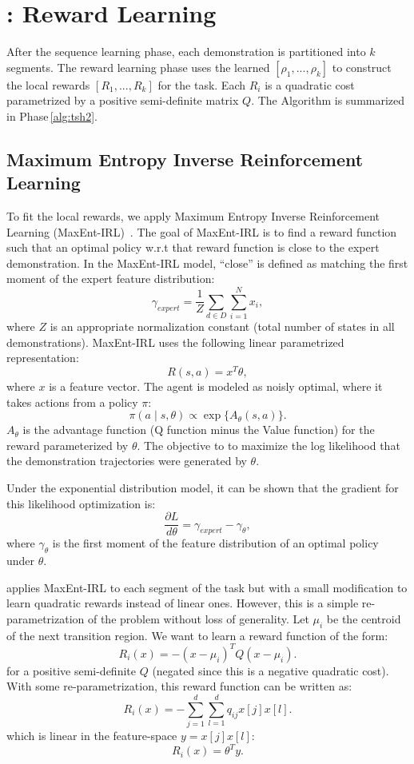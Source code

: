 
\section{\hirl: Reward Learning}\label{sec:reward}
After the sequence learning phase, each demonstration is partitioned into $k$ segments.
The reward learning phase uses the learned $[\rho_1,...,\rho_k]$ to construct the local rewards $[R_1,...,R_k]$ for the task.
Each $R_i$ is a quadratic cost parametrized by a positive semi-definite matrix $Q$.
The Algorithm is summarized in Phase\,\ref{alg:tsh2}.


\subsection{Maximum Entropy Inverse Reinforcement Learning}
To fit the local rewards, we apply Maximum Entropy Inverse Reinforcement Learning (MaxEnt-IRL)~\cite{DBLP:conf/aaai/ZiebartMBD08}. 
The goal of MaxEnt-IRL is to find a reward function such that an optimal policy w.r.t that reward function is close to the
expert demonstration.
In the MaxEnt-IRL model, ``close'' is defined as matching the first moment of the expert feature distribution:
\[
\gamma_{expert} = \frac{1}{Z} \sum_{d \in D} \sum_{i=1}^N x_i,
\]
where $Z$ is an appropriate normalization constant (total number of states in all demonstrations).
MaxEnt-IRL uses the following linear parametrized representation:
\[
R(s,a) = x^T \theta,
\]
where $x$ is a feature vector.
The agent is modeled as noisly optimal, where it takes actions from a policy $\pi$:
\[
\pi(a \mid s, \theta) \propto \exp\{A_\theta(s,a)\}.
\]
$A_\theta$ is the advantage function (Q function minus the Value function) for the reward parameterized by $\theta$.
The objective to to maximize the log likelihood that the demonstration trajectories were generated by  $\theta$.

Under the exponential distribution model, it can be shown that the gradient for this likelihood optimization is:
\[
\frac{\partial L}{d \theta} = \gamma_{expert} - \gamma_{\theta},
\]
where $\gamma_{\theta}$ is the first moment of the feature distribution of an optimal policy under $\theta$.

\hirl applies MaxEnt-IRL to each segment of the task but with a small modification to learn quadratic rewards instead of linear ones. However, this is a simple re-parametrization of the problem without loss of generality.
Let $\mu_i$ be the centroid of the next transition region.
We want to learn a reward function of the form:
\[
R_i(x) = -(x-\mu_i)^T Q (x-\mu_i).
\]
for a positive semi-definite $Q$ (negated since this is a negative quadratic cost).
With some re-parametrization, this reward function can be written as:
\[
R_i(x) = -\sum_{j=1}^d \sum_{l=1}^d q_{ij} x[j] x[l].
\]
which is linear in the feature-space $y = x[j] x[l]$:
\[
R_i(x) = \theta^T y.
\]

